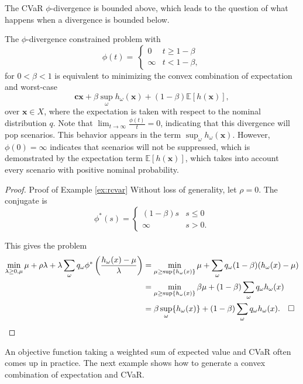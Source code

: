 \documentclass[opre,nonblindrev]{informs3} %
\newcommand{\E}{\mathbb{E}}
\newcommand{\e}[1]{\E \left[ #1 \right]}
\newcommand{\x}{\mathbf{x}}
\renewcommand{\c}{\mathbf{c}}
\begin{document}
The CVaR $\phi$-divergence is bounded above, which leads to the question of what happens when a divergence is bounded below.
\begin{example}
	\label{ex:rcvar}
	The $\phi$-divergence constrained problem with
	\[
		\phi(t) = \
		\begin{cases}
			0 & t \geq 1-\beta \\
			\infty & t < 1-\beta,
		\end{cases}
	\]
	for $0 < \beta < 1$ is equivalent to minimizing the convex combination of expectation and worst-case
	\[
		\c\x + \beta \sup_\omega h_\omega(\x) + (1-\beta)\e{h(\x)},
	\]
	over $\x \in X$, where the expectation is taken with respect to the nominal distribution $q$.
	Note that $\lim_{t \rightarrow \infty} \frac{\phi(t)}{t} = 0$, indicating that this divergence will pop scenarios.
	This behavior appears in the term $\sup_\omega h_\omega(\x)$.
	However, $\phi(0) = \infty$ indicates that scenarios will not be suppressed, which is demonstrated by the expectation term $\e{h(\x)}$, which takes into account every scenario with positive nominal probability.
\end{example}

\begin{proof}{\sc Proof of Example \ref{ex:rcvar}}
	Without loss of generality, let $\rho = 0$.
	The conjugate is
	\[
		\phi^*(s) =
		\begin{cases}
			(1-\beta) s & s \leq 0 \\
			\infty & s > 0.
		\end{cases}
	\]
	
	This gives the problem
	\begin{align*}
		\min_{\lambda \geq 0,\mu} \mu + \rho \lambda + \lambda \sum_\omega q_\omega \phi^*\left(\frac{h_\omega(x)-\mu}{\lambda}\right) & = \min_{\mu \geq \sup\{h_\omega(x)\}} \mu + \sum_\omega q_\omega (1-\beta) (h_\omega(x) - \mu) \\
		& = \min_{\mu \geq \sup\{h_\omega(x)\}} \beta \mu + (1-\beta) \sum_\omega q_\omega h_\omega(x) \\
		& = \beta \sup_\omega\{h_\omega(x)\} + (1-\beta) \sum_\omega q_\omega h_\omega(x). \mbox{\quad$\square$}
	\end{align*}
\end{proof}

An objective function taking a weighted sum of expected value and CVaR often comes up in practice.
The next example shows how to generate a convex combination of expectation and CVaR.
\end{document}
